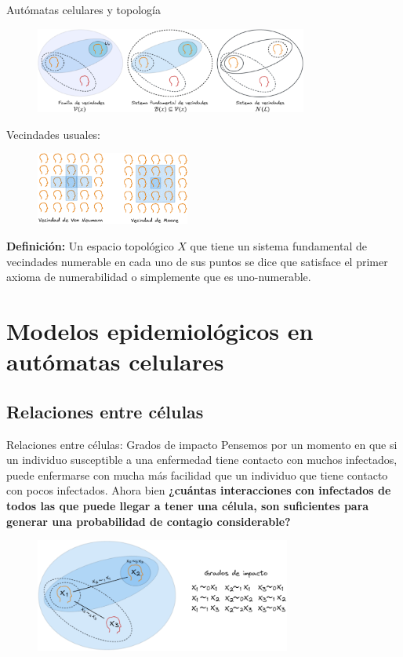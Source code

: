 \documentclass[9pt]{beamer}
\begin{document}
\begin{frame}{Autómatas celulares y topología}
\begin{figure}[h]
  \centering
    \includegraphics[width=0.8\textwidth]{Imagenes/vecindadesDiagrama.png}
\end{figure} 
Vecindades usuales:
\begin{figure}[h]
  \centering
    \includegraphics[width=0.45\textwidth]{Imagenes/vecindadesMyVN.png}
\end{figure} 
\textbf{Definición:} Un espacio topológico $X$ que tiene un sistema fundamental de vecindades numerable en cada uno de sus puntos se dice que satisface el primer axioma de numerabilidad o simplemente que es uno-numerable.
\end{frame}

\section{Modelos epidemiológicos en autómatas celulares}
\subsection{Relaciones entre células}
\begin{frame}{Relaciones entre células: Grados de impacto}
Pensemos por un momento en que si un individuo susceptible a una enfermedad tiene contacto con muchos infectados, puede enfermarse con mucha más facilidad que un individuo que tiene contacto con pocos infectados. Ahora bien \textbf{¿cuántas interacciones con infectados de todos las que puede llegar a tener una célula, son suficientes para generar una probabilidad de contagio considerable?}
\begin{figure}[h]
  \centering
    \includegraphics[width=0.75\textwidth]{Imagenes/gradosDiagrama.png}
\end{figure} 
\end{frame}
\end{document}
